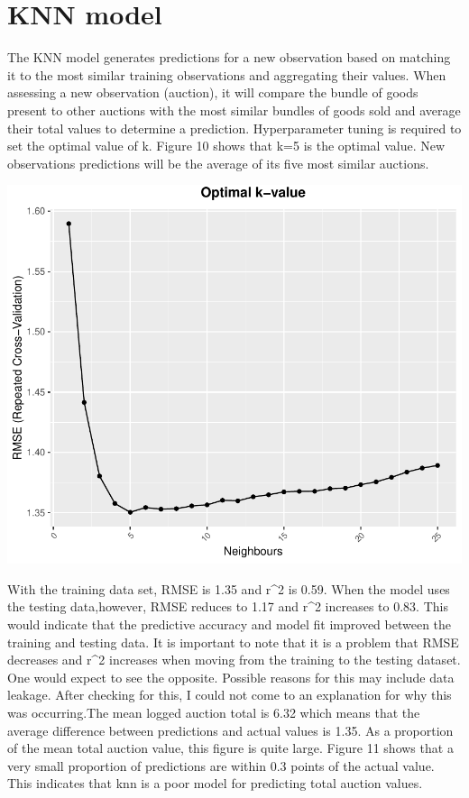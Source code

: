 \documentclass[11pt,preprint, authoryear]{elsarticle}
\numberwithin{equation}{section}
\numberwithin{figure}{section}
\numberwithin{table}{section}
\begin{document}
\hypertarget{knn-model}{%
\section{KNN model}\label{knn-model}}

The KNN model generates predictions for a new observation based on
matching it to the most similar training observations and aggregating
their values. When assessing a new observation (auction), it will
compare the bundle of goods present to other auctions with the most
similar bundles of goods sold and average their total values to
determine a prediction. Hyperparameter tuning is required to set the
optimal value of k. Figure 10 shows that k=5 is the optimal value. New
observations predictions will be the average of its five most similar
auctions.

\begin{center}\includegraphics{Project_write_up_files/figure-latex/Figure10-1} \end{center}

With the training data set, RMSE is 1.35 and r\^{}2 is 0.59. When the
model uses the testing data,however, RMSE reduces to 1.17 and r\^{}2
increases to 0.83. This would indicate that the predictive accuracy and
model fit improved between the training and testing data. It is
important to note that it is a problem that RMSE decreases and r\^{}2
increases when moving from the training to the testing dataset. One
would expect to see the opposite. Possible reasons for this may include
data leakage. After checking for this, I could not come to an
explanation for why this was occurring.The mean logged auction total is
6.32 which means that the average difference between predictions and
actual values is 1.35. As a proportion of the mean total auction value,
this figure is quite large. Figure 11 shows that a very small proportion
of predictions are within 0.3 points of the actual value. This indicates
that knn is a poor model for predicting total auction values.
\end{document}
